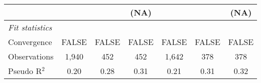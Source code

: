 \begin{tabular}{lcccccc}
                                                                              &                        &                        & (NA)                   &                        &                        & (NA)\\   
   \midrule
   \emph{Fit statistics}\\
   Convergence                                                                &FALSE                   & FALSE                  & FALSE                  & FALSE                  & FALSE                  & FALSE\\  
   Observations                                                               & 1,940                  & 452                    & 452                    & 1,642                  & 378                    & 378\\  
   Pseudo R$^2$                                                               & 0.20                   & 0.28                   & 0.31                   & 0.21                   & 0.31                   & 0.32\\  
   

\end{tabular}
